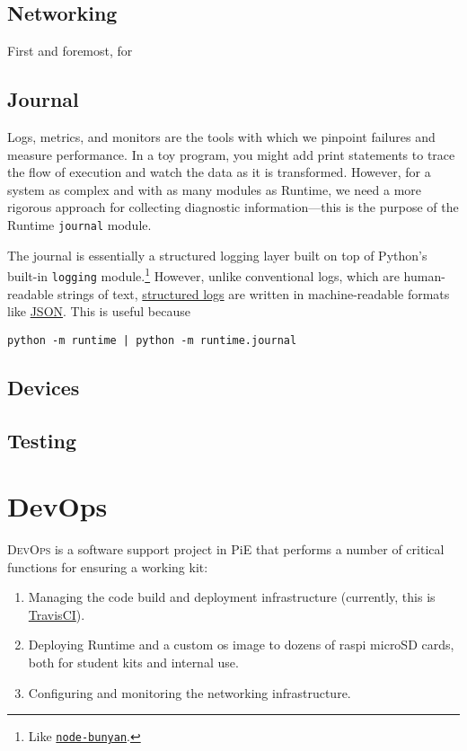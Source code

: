 \documentclass[12pt]{book}
\begin{document}
  \section{Networking}

  First and foremost, for

  \section{Journal}

  Logs, metrics, and monitors are the tools with which we pinpoint failures and measure performance.
  In a toy program, you might add print statements to trace the flow of execution and watch the data as it is transformed.
  However, for a system as complex and with as many modules as Runtime, we need a more rigorous approach for collecting diagnostic information---this is the purpose of the Runtime \texttt{journal} module.

  The journal is essentially a structured logging layer built on top of Python's built-in \texttt{logging} module.\footnote{Like \href{https://github.com/trentm/node-bunyan}{\texttt{node-bunyan}}.}
  However, unlike conventional logs, which are human-readable strings of text, \href{https://stackify.com/what-is-structured-logging-and-why-developers-need-it/}{structured logs} are written in machine-readable formats like \href{https://www.json.org/}{JSON}.
  This is useful because

  \begin{lstlisting}[gobble=4]
    python -m runtime | python -m runtime.journal
  \end{lstlisting}

  \section{Devices}

  \section{Testing}

  \chapter{DevOps}

  \textsc{DevOps} is a software support project in PiE that performs a number of critical functions for ensuring a working kit:
  \begin{enumerate}
    \item Managing the code build and deployment infrastructure (currently, this is \href{https://travis-ci.org/pioneers/PieCentral}{TravisCI}).
    \item Deploying Runtime and a custom \gls{os} \gls{image} to dozens of \gls{raspi} microSD cards, both for student kits and internal use.
    \item Configuring and monitoring the networking infrastructure.
  \end{enumerate}
\end{document}
